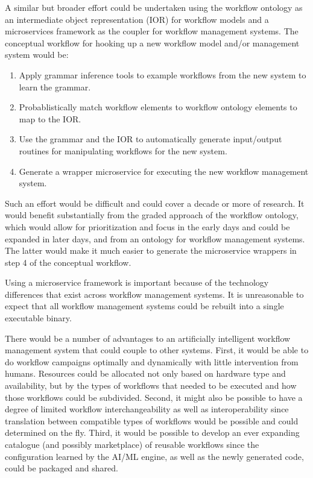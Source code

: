 A similar but broader effort could be undertaken using the workflow ontology as
an intermediate object representation (IOR) for workflow models and a
microservices framework as the coupler for workflow management systems. The
conceptual workflow for hooking up a new workflow model and/or management system
would be:
\begin{enumerate}
  \item Apply grammar inference tools to example workflows from the new system
  to learn the grammar.
  \item Probablistically match workflow elements to workflow ontology elements
  to map to the IOR.
  \item Use the grammar and the IOR to automatically generate input/output
  routines for manipulating workflows for the new system. 
  \item Generate a wrapper microservice for executing the new workflow
  management system.
\end{enumerate}

Such an effort would be difficult and could cover a decade or more of research.
It would benefit substantially from the graded approach of the workflow
ontology, which would allow for prioritization and focus in the early days and
could be expanded in later days, and from an ontology for workflow management
systems. The latter would make it much easier to generate the microservice
wrappers in step 4 of the conceptual workflow.

Using a microservice framework is important because of the technology
differences that exist across workflow management systems. It is unreasonable to
expect that all workflow management systems could be rebuilt into a single
executable binary.

There would be a number of advantages to an artificially intelligent workflow
management system that could couple to other systems. First, it would be able to
do workflow campaigns optimally and dynamically with little intervention from
humans. Resources could be allocated not only based on hardware type and
availability, but by the types of workflows that needed to be executed and how
those workflows could be subdivided. Second, it might also be possible to have
a degree of limited workflow interchangeability as well as interoperability
since translation between compatible types of workflows would be possible and
could determined on the fly. Third, it would be possible to develop an ever
expanding catalogue (and possibly marketplace) of reusable workflows since the
configuration learned by the AI/ML engine, as well as the newly generated code,
could be packaged and shared.

